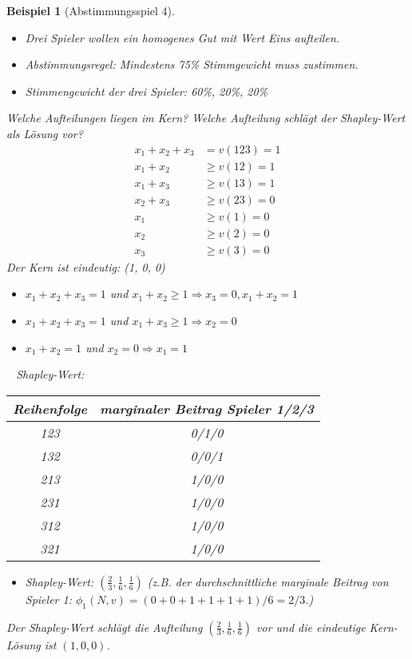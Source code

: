 \documentclass[12pt]{extreport} %
\theoremstyle{named}
\theoremstyle{itshape}
\theoremstyle{normal}
\newtheorem{beispiel}[unnamedtheorem]{Beispiel}
\begin{document}
\begin{beispiel}[Abstimmungsspiel 4] ~\
	\begin{itemize}
		\item Drei Spieler wollen ein homogenes Gut mit Wert Eins aufteilen. 
		\item Abstimmungsregel: Mindestens 75\% Stimmgewicht muss zustimmen.
		\item Stimmengewicht der drei Spieler: 60\%, 20\%, 20\%
	\end{itemize}
	Welche Aufteilungen liegen im Kern? Welche Aufteilung schlägt der Shapley-Wert als Lösung vor?
	\begin{align*}
		x_1 + x_2 + x_3 & = v(123) = 1 \\
		x_1 + x_2 & \geq v(12) = 1 \\
		x_1 + x_3 & \geq v(13) = 1 \\
		x_2 + x_3 & \geq v(23) = 0 \\
		x_1 & \geq v(1) = 0 \\
		x_2 & \geq v(2) = 0 \\
		x_3 & \geq v(3) = 0 		
	\end{align*}
	Der Kern ist eindeutig: (1, 0, 0)
	\begin{itemize}
		\item $x_1 + x_2 + x_3 = 1$ und $x_1 + x_2 \geq 1 \Rightarrow x_3 = 0, x_1 + x_2 = 1$
		\item $x_1 + x_2 + x_3 = 1$ und $x_1 + x_3 \geq 1 \Rightarrow x_2 = 0$
		\item $x_1 + x_2 = 1$ und $x_2 = 0 \Rightarrow x_1 = 1$
	\end{itemize} ~\newpage
	Shapley-Wert: ~\\
	  \begin{figure*}[h!] \centering
		\begin{tabular}{cc}
  			\hline
  				Reihenfolge & marginaler Beitrag Spieler 1/2/3 \\
  			\hline
  				123 & 0/1/0 \\
  				132 & 0/0/1 \\
  				213 & 1/0/0 \\
  				231 & 1/0/0 \\
  				312 & 1/0/0 \\
  				321 & 1/0/0 \\
  			\hline
		\end{tabular}
	\end{figure*}
	\begin{itemize}
		\item Shapley-Wert: $\left( \frac{2}{3}, \frac{1}{6}, \frac{1}{6} \right)$ (z.B. der durchschnittliche marginale Beitrag von Spieler 1: $\phi_1(N, v) = (0+0+1+1+1+1)/6 = 2/3$.)
	\end{itemize}
	Der Shapley-Wert schlägt die Aufteilung $\left( \frac{2}{3}, \frac{1}{6}, \frac{1}{6} \right)$ vor und die eindeutige Kern-Lösung ist $(1, 0, 0)$.
\end{beispiel}
\end{document}
